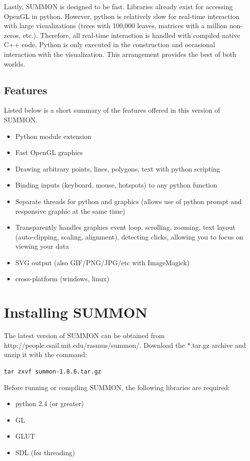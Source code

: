 \documentclass[12pt]{article}
\newcommand{\items}[1]{\begin{itemize} #1 \end{itemize}}
\newcommand{\codeblock}[1]{\vspace{.1in} {\tt #1} \vspace{.1in}}
\newcommand{\version}{1.8.6}
\begin{document}
Lastly, SUMMON is designed to be fast.  Libraries already exist for
accessing OpenGL in python.  However, python is relatively slow for real-time
interaction with large visualizations (trees with 100,000 leaves, matrices with
a million non-zeros, etc.).  Therefore, all real-time interaction is handled
with compiled native C++ code.  Python is only executed in the construction 
and occasional interaction with the visualization.  This arrangement provides 
the best of both worlds.




\subsection{Features}

Listed below is a short summary of the features offered in this version of
SUMMON.

\items{
    \item Python module extension
    \item Fast OpenGL graphics
    \item Drawing arbitrary points, lines, polygons, text with python scripting
    \item Binding inputs (keyboard, mouse, hotspots) to any python function 
    \item Separate threads for python and graphics (allows use of python prompt
          and responsive graphic at the same time)    
    \item Transparently handles graphics event loop, scrolling, zooming, text
          layout (auto-clipping, scaling, alignment), detecting clicks, allowing
          you to focus on viewing your data
    \item SVG output (also GIF/PNG/JPG/etc with ImageMagick)
    \item cross-platform (windows, linux)
}


\section{Installing SUMMON}
\label{sec:installing}

The latest version of SUMMON can be obtained from 
http://people.csail.mit.edu/rasmus/summon/.  Download the *.tar.gz archive and
unzip it with the command:

\codeblock{tar zxvf summon-\version.tar.gz}

Before running or compiling SUMMON, the following libraries are required:
\items {
    \item python 2.4 (or greater)
    \item GL   
    \item GLUT
    \item SDL (for threading)
}
\end{document}
